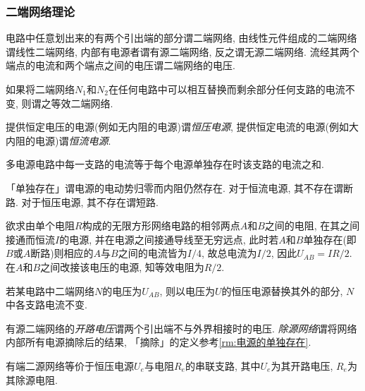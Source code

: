 \documentclass[../Electromagnetism.tex]{subfiles}
\begin{document}

\subsubsection{二端网络理论} %
\label{ssub:二端网络理论}

\begin{definition}[二端网络]
	电路中任意划出来的有两个引出端的部分谓二端网络, 由线性元件组成的二端网络谓线性二端网络, 内部有电源者谓有源二端网络, 反之谓无源二端网络. 流经其两个端点的电流和两个端点之间的电压谓二端网络的电压.
\end{definition}
\begin{definition}[等效二端网络]
	如果将二端网络$N_1$和$N_2$在任何电路中可以相互替换而剩余部分任何支路的电流不变, 则谓之等效二端网络.
\end{definition}
提供恒定电压的电源(例如无内阻的电源)谓\emph{恒压电源}, 提供恒定电流的电源(例如大内阻的电源)谓\emph{恒流电源}.
\begin{finale}
	\begin{theorem}[电路的叠加定理]
		多电源电路中每一支路的电流等于每个电源单独存在时该支路的电流之和.
	\end{theorem}
\end{finale}
\begin{remark}
	\label{rm:电源的单独存在}
	「单独存在」谓电源的电动势归零而内阻仍然存在. 对于恒流电源, 其不存在谓断路. 对于恒压电源, 其不存在谓短路.
\end{remark}
\begin{ex}
	欲求由单个电阻$R$构成的无限方形网络电路的相邻两点$A$和$B$之间的电阻, 在其之间接通而恒流$I$的电源, 并在电源之间接通导线至无穷远点, 此时若$A$和$B$单独存在(即$B$或$A$断路)则相应的$A$与$B$之间的电流皆为$I/4$, 故总电流为$I/2$, 因此$U_{AB} = IR/2$. 在$A$和$B$之间改接该电压的电源, 知等效电阻为$R/2$.
\end{ex}
\begin{finale}
	\begin{theorem}[电路的替代定理]
		若某电路中二端网络$N$的电压为$U_{AB}$, 则以电压为$U$的恒压电源替换其外的部分, $N$中各支路电流不变.
	\end{theorem}
\end{finale}
有源二端网络的\emph{开路电压}谓两个引出端不与外界相接时的电压. \emph{除源网络}谓将网络内部所有电源摘除后的结果, 「摘除」的定义参考\cref{rm:电源的单独存在}.
\begin{finale}
	\begin{theorem}[Thevenin定理]
		有端二源网络等价于恒压电源$U_e$与电阻$R_e$的串联支路, 其中$U_e$为其开路电压, $R_e$为其除源电阻.
	\end{theorem}
\end{finale}
\end{document}

